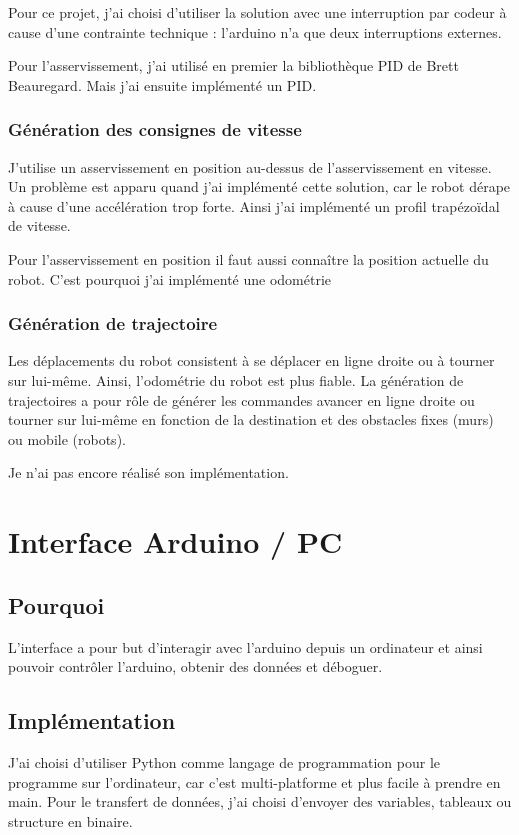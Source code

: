 \documentclass[11pt,a4paper]{report}
\begin{document}
        Pour ce projet, j'ai choisi d'utiliser la solution avec une interruption par codeur à cause d'une contrainte technique : l'arduino n'a que deux interruptions externes.

        Pour l'asservissement, j'ai utilisé en premier la bibliothèque PID de Brett Beauregard. Mais j'ai ensuite implémenté un PID.
      \subsubsection{Génération des consignes de vitesse}
        J'utilise un asservissement en position au-dessus de l'asservissement en vitesse. Un problème est apparu quand j'ai implémenté cette solution, car le robot dérape à cause d'une accélération trop forte. Ainsi j'ai implémenté un profil trapézoïdal de vitesse.

        Pour l'asservissement en position il faut aussi connaître la position actuelle du robot. C'est pourquoi j'ai implémenté une odométrie
      \subsubsection{Génération de trajectoire}
        Les déplacements du robot consistent à se déplacer en ligne droite ou à tourner sur lui-même. Ainsi, l'odométrie du robot est plus fiable. La génération de trajectoires a pour rôle de générer les commandes avancer en ligne droite ou tourner sur lui-même en fonction de la destination et des obstacles fixes (murs) ou mobile (robots).

        Je n'ai pas encore réalisé son implémentation.

  \section{Interface Arduino / PC}
    \subsection{Pourquoi}
      L'interface a pour but d'interagir avec l'arduino depuis un ordinateur et ainsi pouvoir contr\^oler l'arduino, obtenir des données et déboguer.

    \subsection{Implémentation}
      J'ai choisi d'utiliser Python comme langage de programmation pour le programme sur l'ordinateur, car c'est multi-platforme et plus facile à prendre en main.
      Pour le transfert de données, j'ai choisi d'envoyer des variables, tableaux ou structure en binaire.
\end{document}
